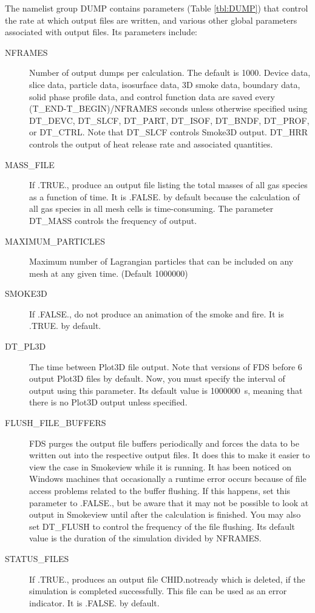 \documentclass[11pt]{book}
\begin{document}
The namelist group {\ct DUMP} contains parameters (Table \ref{tbl:DUMP}) that control the rate at which output files are written, and various other global parameters associated with output files. Its parameters include:
\begin{description}
\item[{\ct NFRAMES}] Number of output dumps per calculation. The default is 1000. Device data, slice data, particle data, isosurface data, 3D smoke data, boundary data, solid phase profile data, and control function data are saved every {\ct (T\_END-T\_BEGIN)/NFRAMES} seconds unless otherwise specified using {\ct DT\_DEVC}, {\ct DT\_SLCF}, {\ct DT\_PART}, {\ct DT\_ISOF}, {\ct DT\_BNDF}, {\ct DT\_PROF}, or {\ct DT\_CTRL}. Note that {\ct DT\_SLCF} controls Smoke3D output. {\ct DT\_HRR} controls the output of heat release rate and associated quantities.
\item[{\ct MASS\_FILE}] If {\ct .TRUE.}, produce an output file listing the total masses of all gas species as a function of time. It is {\ct .FALSE.} by default because the calculation of all gas species in all mesh cells is time-consuming. The parameter {\ct DT\_MASS} controls the frequency of output.
\item[{\ct MAXIMUM\_PARTICLES}] Maximum number of Lagrangian particles that can be included on any mesh at any given time. (Default 1000000)
\item[{\ct SMOKE3D}] If {\ct .FALSE.}, do not produce an animation of the smoke and fire. It is {\ct .TRUE.} by default.
\item[{\ct DT\_PL3D}] The time between Plot3D file output. Note that versions of FDS before 6 output Plot3D files by default. Now, you must specify the interval of output using this parameter. Its default value is 1000000~s, meaning that there is no Plot3D output unless specified.
\item[{\ct FLUSH\_FILE\_BUFFERS}] FDS purges the output file buffers periodically and forces the data to be written out into the respective output files. It does this to make it easier to view the case in Smokeview while it is running. It has been noticed on Windows machines that occasionally a runtime error occurs because of file access problems related to the buffer flushing. If this happens, set this parameter to {\ct .FALSE.}, but be aware that it may not be possible to look at output in Smokeview until after the calculation is finished. You may also set {\ct DT\_FLUSH} to control the frequency of the file flushing. Its default value is the duration of the simulation divided by {\ct NFRAMES}.
\item[{\ct STATUS\_FILES}] If {\ct .TRUE.}, produces an output file {\ct CHID.notready} which is deleted, if the simulation is completed successfully. This file can be used as an error indicator. It is {\ct .FALSE.} by default.
\end{description}
\end{document}
